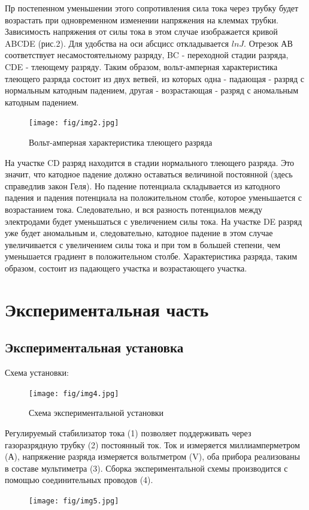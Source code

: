 Пр  постепенном уменьшении этого сопротивления сила тока через трубку будет возрастать при одновременном изменении 
напряжения на клеммах трубки. Зависимость напряжения от силы тока в этом случае изображается кривой ABCDE (рис.2). 
Для удобства на оси абсцисс откладывается $ln J$. Отрезок АВ соответствует несамостоятельному разряду, BC - переходной 
стадии разряда, CDE - тлеющему разряду. Таким образом, вольт-амперная характеристика тлеющего разряда состоит из 
двух ветвей, из которых одна - падающая - разряд с нормальным катодным падением, другая - возрастающая - разряд с 
аномальным катодным падением.

\begin{figure}[h!]
	\centering
	\texttt{[image: fig/img2.jpg]}
	\caption{Вольт-амперная характеристика тлеющего разряда}
	\label{fig:2}
\end{figure}

На участке CD разряд находится в стадии нормального тлеющего разряда. Это значит, что катодное падение должно оставаться 
величиной постоянной (здесь справедлив закон Геля). Но падение потенциала складывается из катодного падения и падения 
потенциала на положительном столбе, которое уменьшается с возрастанием тока. Следовательно, и вся разность потенциалов 
между электродами будет уменьшаться с увеличением силы тока. На участке DE разряд уже будет аномальным и, следовательно,
 катодное падение в этом случае увеличивается с увеличением силы тока и при том в большей степени, чем уменьшается 
 градиент в положительном столбе. Характеристика разряда, таким образом, состоит из падающего участка и возрастающего
  участка.


\section{Экспериментальная часть}
\subsection{Экспериментальная установка}
Схема установки:
\begin{figure}[h!]
	\centering
	\texttt{[image: fig/img4.jpg]}
	\caption{Схема экспериментальной установки}
	\label{fig:3}
\end{figure}

Регулируемый стабилизатор тока (1) позволяет поддерживать через газоразрядную трубку (2) постоянный ток. Ток и 
измеряется миллиамперметром (А), напряжение разряда измеряется вольтметром (V), оба прибора реализованы в составе 
мультиметра (3). Сборка экспериментальной схемы производится с помощью соединительных проводов (4).
\begin{figure}[h!]
	\centering
	\texttt{[image: fig/img5.jpg]}
	\caption{}
	\label{fig:4}
\end{figure}

